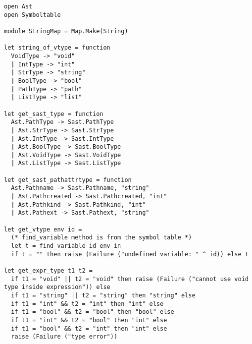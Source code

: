 \documentclass[11pt]{article}
\begin{document}
\begin{listing}[H]
  \begin{verbatim}
open Ast
open Symboltable

module StringMap = Map.Make(String)

let string_of_vtype = function
  VoidType -> "void"
  | IntType -> "int"
  | StrType -> "string"
  | BoolType -> "bool"
  | PathType -> "path"
  | ListType -> "list"

let get_sast_type = function
  Ast.PathType -> Sast.PathType
  | Ast.StrType -> Sast.StrType
  | Ast.IntType -> Sast.IntType
  | Ast.BoolType -> Sast.BoolType
  | Ast.VoidType -> Sast.VoidType
  | Ast.ListType -> Sast.ListType

let get_sast_pathattrtype = function
  Ast.Pathname -> Sast.Pathname, "string"
  | Ast.Pathcreated -> Sast.Pathcreated, "int"
  | Ast.Pathkind -> Sast.Pathkind, "int"
  | Ast.Pathext -> Sast.Pathext, "string"

let get_vtype env id =
  (* find_variable method is from the symbol table *)
  let t = find_variable id env in
  if t = "" then raise (Failure ("undefined variable: " ^ id)) else t

let get_expr_type t1 t2 =
  if t1 = "void" || t2 = "void" then raise (Failure ("cannot use void type inside expression")) else
  if t1 = "string" || t2 = "string" then "string" else
  if t1 = "int" && t2 = "int" then "int" else
  if t1 = "bool" && t2 = "bool" then "bool" else
  if t1 = "int" && t2 = "bool" then "int" else
  if t1 = "bool" && t2 = "int" then "int" else
  raise (Failure ("type error"))
  \end{verbatim}
\end{listing}
\end{document}
